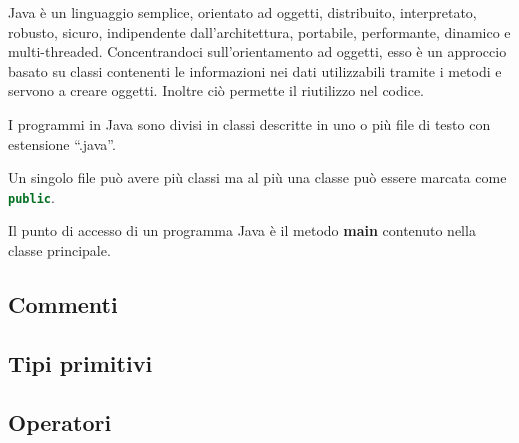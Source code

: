 \documentclass{subfiles}
\begin{document}
Java è un linguaggio semplice, orientato ad oggetti, distribuito, interpretato, robusto, sicuro, indipendente dall'architettura,
portabile, performante, dinamico e multi-threaded.
\noindent
Concentrandoci sull'orientamento ad oggetti, esso è un approccio basato su classi contenenti le informazioni nei dati utilizzabili
tramite i metodi e servono a creare oggetti. Inoltre ciò permette il riutilizzo nel codice.

I programmi in Java sono divisi in classi descritte in uno o più file di testo con estensione ``.java''.

\begin{Note*} \label{Note:1}
    Un singolo file può avere più classi ma al più una classe può essere marcata come \lstinline[language = java]{public}.
\end{Note*}
\begin{Note*}\label{Note:2}
    Il punto di accesso di un programma Java è il metodo \textbf{main} contenuto nella classe principale.
\end{Note*}


\subsection{Commenti}


\subsection{Tipi primitivi}


\subsection{Operatori}

\end{document}
